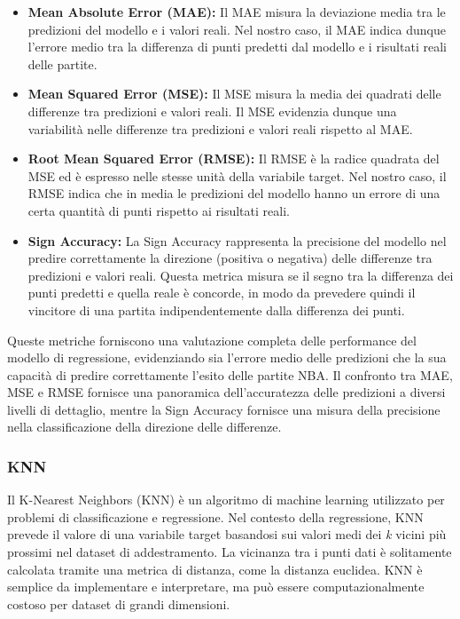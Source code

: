 \documentclass[a4paper]{article}
\numberwithin{equation}{section}
\begin{document}
\begin{itemize}
    \item \textbf{Mean Absolute Error (MAE):} Il MAE misura la deviazione media tra le predizioni del modello e i valori reali. Nel nostro caso, il MAE indica dunque l'errore medio tra la differenza di punti predetti dal modello e i risultati reali delle partite.

    \item \textbf{Mean Squared Error (MSE):} Il MSE misura la media dei quadrati delle differenze tra predizioni e valori reali. Il MSE evidenzia dunque una variabilità nelle differenze tra predizioni e valori reali rispetto al MAE.

    \item \textbf{Root Mean Squared Error (RMSE):} Il RMSE è la radice quadrata del MSE ed è espresso nelle stesse unità della variabile target. Nel nostro caso, il RMSE indica che in media le predizioni del modello hanno un errore di una certa quantità di punti rispetto ai risultati reali.

    \item \textbf{Sign Accuracy:} La Sign Accuracy rappresenta la precisione del modello nel predire correttamente la direzione (positiva o negativa) delle differenze tra predizioni e valori reali. Questa metrica misura se il segno tra la differenza dei punti predetti e quella reale è concorde, in modo da prevedere quindi il vincitore di una partita indipendentemente dalla differenza dei punti.
\end{itemize}

Queste metriche forniscono una valutazione completa delle performance del modello di regressione, evidenziando sia l'errore medio delle predizioni che la sua capacità di predire correttamente l'esito delle partite NBA. Il confronto tra MAE, MSE e RMSE fornisce una panoramica dell'accuratezza delle predizioni a diversi livelli di dettaglio, mentre la Sign Accuracy fornisce una misura della precisione nella classificazione della direzione delle differenze.

\subsubsection{KNN}

Il K-Nearest Neighbors (KNN) è un algoritmo di machine learning utilizzato per problemi di classificazione e regressione. Nel contesto della regressione, KNN prevede il valore di una variabile target basandosi sui valori medi dei \textit{k} vicini più prossimi nel dataset di addestramento. La vicinanza tra i punti dati è solitamente calcolata tramite una metrica di distanza, come la distanza euclidea. KNN è semplice da implementare e interpretare, ma può essere computazionalmente costoso per dataset di grandi dimensioni.
\end{document}
